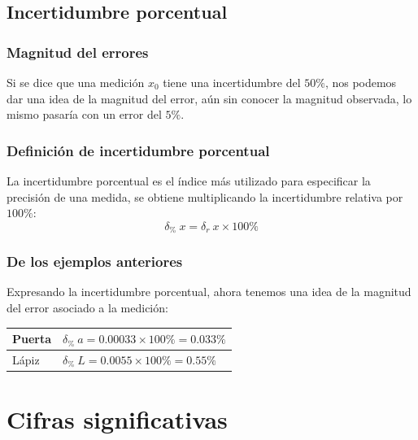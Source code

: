 \subsection{Incertidumbre porcentual}
\begin{frame}
\frametitle{Magnitud del errores}
Si se dice que una medición $x_{0}$ tiene una incertidumbre del $50\%$, nos podemos dar una idea de la magnitud del error, aún sin conocer la magnitud observada, lo mismo pasaría con un error del $5\%$.
\end{frame}
\begin{frame}
\frametitle{Definición de incertidumbre porcentual}
La incertidumbre porcentual es el índice más utilizado para especificar la precisión de una medida, se obtiene multiplicando la incertidumbre relativa por $100\%$:
\[ \delta_{\%} \: x  = \delta_{r} \: x  \times 100 \% \]
\end{frame}
\begin{frame}
\frametitle{De los ejemplos anteriores}
Expresando la incertidumbre porcentual, ahora tenemos una idea de la magnitud del error asociado a la medición:
\\
\bigskip
\begin{tabular}{l | l}
\hline
Puerta & $\delta_{\%} \: a = 0.00033 \times 100 \% = 0.033 \%$ \\ \hline
Lápiz & $\delta_{\%} \: L = 0.0055 \times 100 \% = 0.55 \%$ \\ \hline
\end{tabular}
\end{frame}
\section{Cifras significativas}
